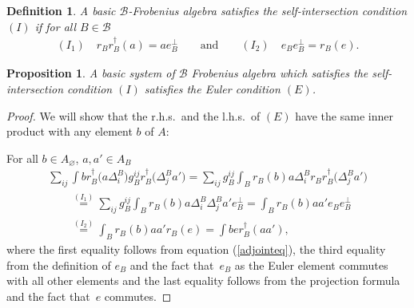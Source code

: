 \documentclass[pdftex]{sigma}
\newtheorem{prop}[thm]{Proposition}
\newtheorem{df}[thm]{Definition}
\def\calB{{\mathcal B}}
\def\res{r}
\begin{document}
\begin{df}
\label{selfdef}
A basic $\calB$-Frobenius algebra satisf\/ies  the {\em self-intersection} condition $(I)$
if for all $B\in \calB$
\begin{gather*}
(I_1) \quad r_{B}r^{\dagger}_{B}  (a)=  a e^{\perp}_{B} \qquad \text{and}\qquad
(I_2) \quad  e_Be^{\perp}_B =  \res_B(e).
\end{gather*}
\end{df}



\begin{prop}A  basic system of  $\calB$ Frobenius algebra which satisfies the self-intersection condition $(I)$ satisfies the Euler condition $(E)$.
\end{prop}

\begin{proof} We will show that the r.h.s.\ and the l.h.s.\ of $(E)$ have
the same inner product with any element $b$ of $A$:

For all $b\in A_{\varnothing}$, $a, a'\in A_B$
\begin{gather*} \sum_{ij} \int b  \res_B^{\dagger}\big(a\Delta^{B}_i\big)
g_{B}^{ij}  \res_B^{\dagger}\big(\Delta^{B}_j a'\big)
 = \sum_{ij}g_{B}^{ij}
 \int_B \res_{B}(b)a\Delta^{B}_i
 \res_{B}\res_B^{\dagger}\big(\Delta^{B}_ja'\big) \\
\qquad{}  \stackrel{(I_1)}{=} \sum_{ij}g_{B}^{ij}
 \int_B \res_{B}(b)a\Delta^{B}_i \Delta^{B}_j
 a'e_{B}^{\perp}
 =
 \int_B \res_{B}(b)aa' e_B e_B^{\perp}\\
\qquad{} \stackrel{(I_2)}{=} \int_B \res_{B}(b)aa'\res_B(e)
 = \int b  e\res_B^{\dagger}(aa'),
\end{gather*}
where the f\/irst   equality follows from equation (\ref{adjointeq}),
the third equality from the def\/inition of $e_B$ and the fact that~$e_B$ as the Euler element commutes with all other elements and the
last equality follows from the projection formula and the fact that~$e$ commutes.
\end{proof}
\end{document}
